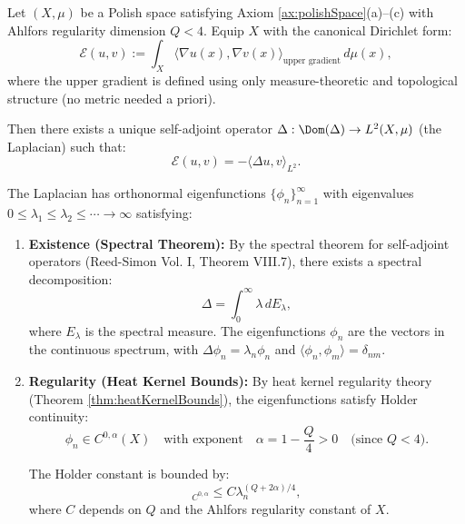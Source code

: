 

\begin{lemma}
\label{lem:eigenfunctionMetricIndependent}

Let $(X, \mu)$ be a Polish space satisfying Axiom \ref{ax:polishSpace}(a)--(c) with Ahlfors regularity dimension $Q < 4$. Equip $X$ with the canonical Dirichlet form:
\begin{equation}
\mathcal{E}(u, v) := \int_X \langle \nabla u(x), \nabla v(x) \rangle_{\text{upper gradient}} \, d\mu(x),
\end{equation}
where the upper gradient is defined using only measure-theoretic and topological structure (no metric needed a priori).

Then there exists a unique self-adjoint operator $\Delta: \Dom(\Delta) \to L^2(X, \mu)$ (the Laplacian) such that:
\begin{equation}
\mathcal{E}(u, v) = -\langle \Delta u, v \rangle_{L^2}.
\end{equation}

The Laplacian has orthonormal eigenfunctions $\{\phi_n\}_{n=1}^\infty$ with eigenvalues $0 \leq \lambda_1 \leq \lambda_2 \leq \cdots \to \infty$ satisfying:

\begin{enumerate}

\item \textbf{Existence (Spectral Theorem):} By the spectral theorem for self-adjoint operators (Reed-Simon Vol. I, Theorem VIII.7), there exists a spectral decomposition:
\begin{equation}
\Delta = \int_0^\infty \lambda \, dE_\lambda,
\end{equation}
where $E_\lambda$ is the spectral measure. The eigenfunctions $\phi_n$ are the vectors in the continuous spectrum, with $\Delta \phi_n = \lambda_n \phi_n$ and $\langle \phi_n, \phi_m \rangle = \delta_{nm}$.

\item \textbf{Regularity (Heat Kernel Bounds):} By heat kernel regularity theory (Theorem \ref{thm:heatKernelBounds}), the eigenfunctions satisfy Holder continuity:
\begin{equation}
\phi_n \in C^{0, \alpha}(X) \quad \text{with exponent} \quad \alpha = 1 - \frac{Q}{4} > 0 \quad \text{(since } Q < 4\text{)}.
\end{equation}

The Holder constant is bounded by:
\begin{equation}
[\phi_n]_{C^{0,\alpha}} \leq C \lambda_n^{(Q+2\alpha)/4},
\end{equation}
where $C$ depends on $Q$ and the Ahlfors regularity constant of $X$.


\end{enumerate}
\end{lemma}
